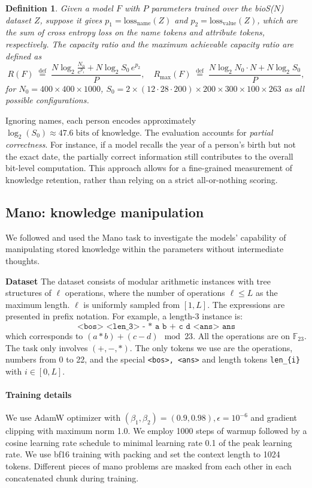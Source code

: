 \documentclass[]{bytedance_seed}
\newcommand{\1}{\mathbf{1}}
\newtheorem{definition}{Definition}
\begin{document}
\begin{definition}
    Given a model $F$ with $P$ parameters trained over the bioS($N$) dataset $Z$, suppose it gives 
$p_1 = \text{loss}_{\text{name}}(Z)$ and $p_2 = \text{loss}_{\text{value}}(Z)$, which are the sum of cross entropy loss on the name tokens and attribute tokens, respectively.
The \emph{capacity ratio} 
and the maximum achievable capacity ratio are
 defined as
\[
R(F) \; \overset{\text{def}}{=} \; \frac{N \log_2 \frac{N_0}{e^{p_1}} + N \log_2 S_0 \, e^{p_2}}{P}, \quad R_{\max}(F) \; \overset{\text{def}}{=} \; \frac{N \log_2 N_0 \cdot N + N \log_2 S_0}{P},
\]
for 
$N_0 = 400 \times 400 \times 1000$, $S_0 = 2 \times (12 \cdot 28 \cdot 200) \times 200 \times 300 \times 100 \times 263$ as all possible configurations.
\end{definition}

Ignoring names, each person encodes approximately $\log_2(S_0) \approx 47.6 \; \text{bits of knowledge}.$ 
The evaluation accounts for \emph{partial correctness}. For instance, if a model 
recalls the year of a person’s birth but not the exact date, the partially correct information 
still contributes to the overall bit-level computation. This approach allows for a fine-grained 
measurement of knowledge retention, rather than relying on a strict all-or-nothing scoring. 


\subsection{Mano: knowledge manipulation}
\label{appendix:mano}
We followed \cite{Allenzhu2025-canon} and used the Mano task to investigate the models' capability of manipulating stored knowledge within the parameters without intermediate thoughts. 

\textbf{Dataset} The dataset consists of modular arithmetic instances with tree structures of $\ell$ operations, where the number of operations $\ell\le L$ as the maximum length. $\ell$ is uniformly sampled from $[1,L]$. The expressions are presented in prefix notation. For example, a length-3 instance is:
$$\texttt{<bos> <len\_3> - * a b + c d <ans> ans}$$
which corresponds to $(a*b)+(c-d)\mod 23$. All the operations are on $\mathbb{F}_{23}$. The task only involves $(+,-,*)$. The only tokens we use are the operations, numbers from 0 to 22, and the special \texttt{<bos>, <ans>} and length tokens \texttt{len\_\{i\}} with $i\in [0,L]$.

\paragraph{Training details} We use AdamW optimizer with $(\beta_1,\beta_2)=(0.9,0.98), \epsilon=10^{-6}$ and gradient clipping with maximum norm 1.0. We employ 1000 steps of warmup followed by a cosine learning rate schedule to minimal learning rate 0.1 of the peak learning rate. We use bf16 training with packing and set the context length to 1024 tokens. Different pieces of mano problems are masked from each other in each concatenated chunk during training.
\end{document}
